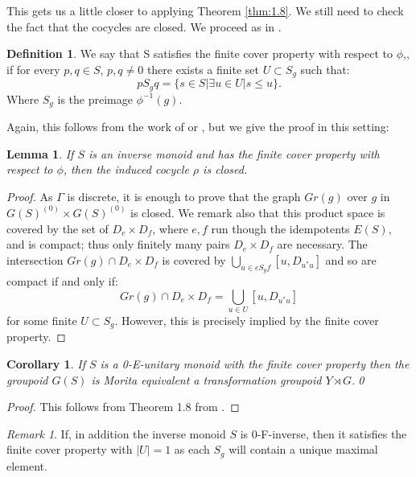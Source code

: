 \documentclass[11pt]{amsart}
\theoremstyle{plain}
\newtheorem{lemma}[theorem]{Lemma}%
\newtheorem{corollary}[theorem]{Corollary}%
\theoremstyle{definition}%
\newtheorem{definition}[theorem]{Definition}%
\theoremstyle{remark}%
\newtheorem{remark}[theorem]{Remark}%
\begin{document}
This gets us a little closer to applying Theorem \ref{thm:1.8}. We still need to check the fact that the cocycles are closed. We proceed as in \cite{MR1900993}.

\begin{definition}
We say that S satisfies the finite cover property with respect to $\phi$,, if for every $p,q \in S$, $p,q\not = 0$ there exists a finite set $U \subset S_{g}$ such that:
\begin{equation*}
pS_{g}q=\lbrace s \in S | \exists u \in U | s \leq u \rbrace.
\end{equation*}
Where $S_{g}$ is the preimage $\phi^{-1}(g)$.
\end{definition}

Again, this follows from the work of \cite{Milan-Steinberg} or \cite{MR1900993}, but we give the proof in this setting:

\begin{lemma}
If $S$ is an inverse monoid and has the finite cover property with respect to $\phi$, then the induced cocycle $\rho$ is closed.
\end{lemma}
\begin{proof}
As $\Gamma$ is discrete, it is enough to prove that the graph $Gr(g)$ over $g$ in $G(S)^{(0)}\times G(S)^{(0)}$ is closed. We remark also that this product space is covered by the set of $D_{e} \times D_{f}$, where $e,f$ run though the idempotents $E(S)$, and is compact; thus only finitely many pairs $D_{e}\times D_{f}$ are necessary. The intersection $Gr(g) \cap D_{e}\times D_{f}$ is covered by $\bigcup_{u \in eS_{g}f} [u,D_{u^{*}u}]$ and so are compact if and only if:
\begin{equation*}
Gr(g) \cap D_{e}\times D_{f} = \bigcup_{u \in U}[u,D_{u^{*}u}]
\end{equation*}
for some finite $U \subset S_{g}$. However, this is precisely implied by the finite cover property.
\end{proof}

\begin{corollary}\label{Thm:Trick}
If $S$ is a 0-E-unitary monoid with the finite cover property then the groupoid $G(S)$ is Morita equivalent a transformation groupoid $Y \rtimes G$.\qed
\end{corollary}
\begin{proof}
This follows from Theorem 1.8 from \cite{MR1900993}.
\end{proof}

\begin{remark}
If, in addition the inverse monoid $S$ is 0-F-inverse, then it satisfies the finite cover property with $\vert U \vert=1$ as each $S_{g}$ will contain a unique maximal element.
\end{remark}
\end{document}
